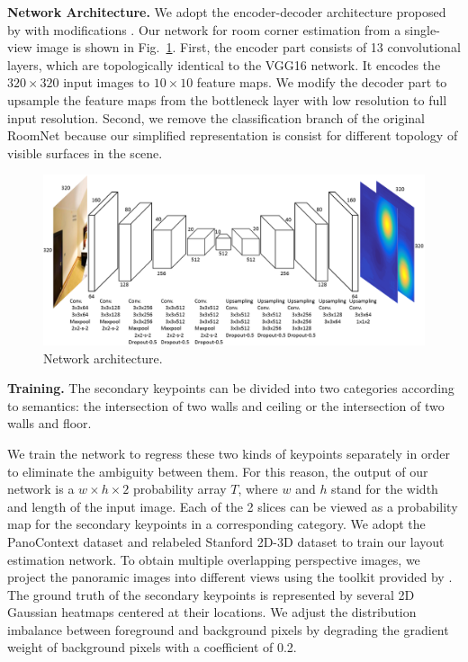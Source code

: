 \noindent\textbf{Network Architecture.} We adopt the encoder-decoder architecture proposed by \cite{roomnet} with modifications . 
Our network for room corner estimation from a single-view image is shown in Fig.~\ref{fig:network}. 
First, the encoder part consists of 13 convolutional layers, which are topologically identical to the VGG16 network. It encodes the $320\times320$ input images to $10\times10$ feature maps. 
We modify the decoder part to upsample the feature maps from the bottleneck layer with low resolution to full input resolution. 
%
Second, we remove the classification branch of the original RoomNet because our simplified representation is consist for different topology of visible surfaces in the scene. 
 

\begin{figure}
	\centering
	\includegraphics[width=\linewidth]{figs/network.png}
	\caption{Network architecture. }
	\label{fig:network}
\end{figure}

\noindent\textbf{Training.} 
The secondary keypoints can be divided into two categories according to semantics: the intersection of two walls and ceiling or the intersection of two walls and floor.

We train the network to regress these two kinds of keypoints separately in order to eliminate the ambiguity between them. For this reason, the output of our network is a $w \times h \times 2$ probability array $T$, where $w$ and $h$ stand for the width and length of the input image. Each of the 2 slices can be viewed as a probability map for the secondary keypoints in a corresponding category. 
We adopt the PanoContext dataset \cite{pano} and relabeled Stanford 2D-3D dataset \cite{layoutnet} to train our layout estimation network. 
To obtain multiple overlapping perspective images, we project the panoramic images into different views using the toolkit provided by \cite{pano}. The ground truth of the secondary keypoints is represented by several 2D Gaussian heatmaps centered at their locations. We adjust the distribution imbalance between foreground and background pixels by degrading the gradient weight of background pixels with a coefficient of 0.2.

